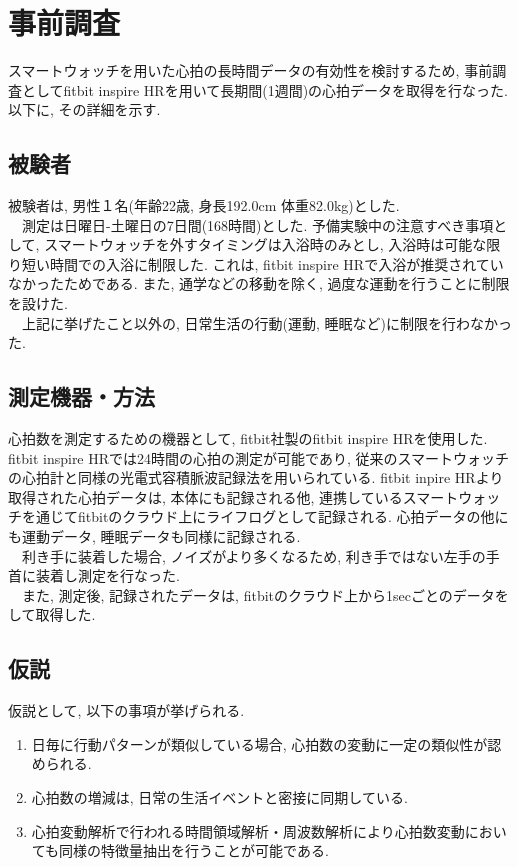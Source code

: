 \documentclass[report, 11pt, a4paper]{jsbook}
\begin{document}
\chapter{事前調査}
スマートウォッチを用いた心拍の長時間データの有効性を検討するため, 事前調査としてfitbit inspire HRを用いて長期間(1週間)の心拍データを取得を行なった. 以下に, その詳細を示す.

\section{被験者}
被験者は, 男性１名(年齢22歳, 身長192.0cm 体重82.0kg)とした.\\
　測定は日曜日-土曜日の7日間(168時間)とした. 予備実験中の注意すべき事項として, スマートウォッチを外すタイミングは入浴時のみとし, 入浴時は可能な限り短い時間での入浴に制限した. これは, fitbit inspire HRで入浴が推奨されていなかったためである. また, 通学などの移動を除く, 過度な運動を行うことに制限を設けた. \\
　上記に挙げたこと以外の, 日常生活の行動(運動, 睡眠など)に制限を行わなかった. 

\section{測定機器・方法}
心拍数を測定するための機器として, fitbit社製のfitbit inspire HRを使用した. fitbit inspire HRでは24時間の心拍の測定が可能であり, 従来のスマートウォッチの心拍計と同様の光電式容積脈波記録法を用いられている. fitbit inpire HRより取得された心拍データは, 本体にも記録される他, 連携しているスマートウォッチを通じてfitbitのクラウド上にライフログとして記録される. 心拍データの他にも運動データ, 睡眠データも同様に記録される.\\
　利き手に装着した場合, ノイズがより多くなるため, 利き手ではない左手の手首に装着し測定を行なった. \\
　また, 測定後, 記録されたデータは, fitbitのクラウド上から1secごとのデータをして取得した. 

\section{仮説}
仮説として, 以下の事項が挙げられる. 

\begin{enumerate}
  \item 日毎に行動パターンが類似している場合, 心拍数の変動に一定の類似性が認められる.
  \item 心拍数の増減は, 日常の生活イベントと密接に同期している. 
  \item 心拍変動解析で行われる時間領域解析・周波数解析により心拍数変動においても同様の特徴量抽出を行うことが可能である.
\end{enumerate}
\end{document}
